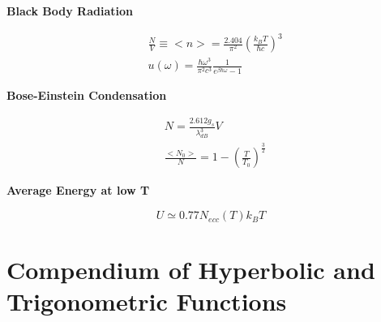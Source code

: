 \documentclass{article}
\begin{document}
\newpage

\newpage
\begin{tcolorbox}[colframe=gray!90, colback=gray!5, coltitle=white, sharp corners, title=\textbf{Bose Gas, Summary}, fonttitle=\large\bfseries]
    \textbf{Black Body Radiation}

    \begin{equation}
        \begin{aligned}
             & \frac{N}{V}\equiv<n>=\frac{2.404}{\pi^2}\left(\frac{k_B T}{\hbar c}\right)^3 \\
             & u(\omega)=\frac{\hbar \omega^3}{\pi^2c^3}\frac{1}{e^{\beta\hbar\omega}-1}
        \end{aligned}
    \end{equation}

    \textbf{Bose-Einstein Condensation}

    \begin{equation}
        \begin{aligned}
             & N=\frac{2.612 g_s}{\lambda_{dB}^3}V                        \\
             & \frac{<N_0>}{N}=1-\left(\frac{T}{T_0}\right)^{\frac{3}{2}}
        \end{aligned}
    \end{equation}

    \textbf{Average Energy at low T}

    \begin{equation}
        U\simeq 0.77N_{ecc}(T)k_BT
    \end{equation}

\end{tcolorbox}
\newpage




\newpage



\section{Compendium of Hyperbolic and Trigonometric Functions}
\end{document}

